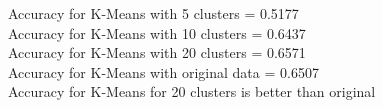 \begin{enumerate}
Accuracy for K-Means with 5 clusters = 0.5177 \\
Accuracy for K-Means with 10 clusters =     0.6437 \\
Accuracy for K-Means with 20 clusters =     0.6571 \\
Accuracy for K-Means with original data =     0.6507 \\

Accuracy for K-Means for 20 clusters is better than original \\

\end{enumerate}


